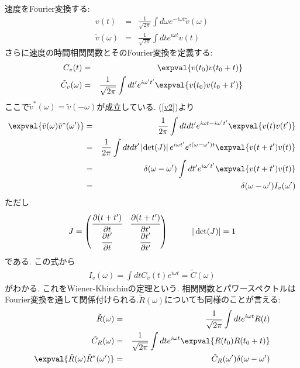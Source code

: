 \documentclass[10.5pt,a4paper]{jreport}
\begin{document}
速度をFourier変換する:
\begin{eqnarray}
  v(t) &=& \frac{1}{\sqrt{2\pi}}\int d\omega e^{-i\omega t}\tilde{v}(\omega)\label{v1}\\
  \tilde{v}(\omega) &=& \frac{1}{\sqrt{2\pi}}\int dt e^{i\omega t}v(t)\label{v2}
\end{eqnarray}
さらに速度の時間相関関数とそのFourier変換を定義する:
\begin{eqnarray}
  C_v(t) &=& \expval{v(t_0)v(t_0 + t)}\\
  \tilde{C}_v(\omega) &=& \frac{1}{\sqrt{2\pi}}\int dt'e^{i\omega't'}\expval{v(t_0)v(t_0+t')}
\end{eqnarray}
ここで$\tilde{v}^*(\omega) = \tilde{v}(-\omega)$が成立している. (\ref{v2})より
\begin{eqnarray}
  \expval{\tilde{v}(\omega)\tilde{v}^*(\omega')} &=& \frac{1}{2\pi}\int dtdt' e^{i\omega t-i\omega' t'}\expval{v(t)v(t')}\\
  &=&\frac{1}{2\pi}\int dtdt'\left|\det(J)\right| e^{i\omega t'}e^{i(\omega -\omega')t}\expval{v(t+t')v(t)}\\
  &=&\delta(\omega-\omega')\int dt'e^{i\omega' t'}\expval{v(t+t')v(t)}\\
  &=&\delta(\omega-\omega')I_v(\omega')
\end{eqnarray}
ただし
\begin{eqnarray}
  J =
  \begin{pmatrix}
    \cfrac{\partial(t+t')}{\partial t}&\cfrac{\partial(t+t')}{\partial t'}\\
    \cfrac{\partial t'}{\partial t}&\cfrac{\partial t'}{\partial t'}\\
  \end{pmatrix}\hspace{1cm} |\det(J)| = 1
\end{eqnarray}
である. この式から
\begin{eqnarray}
  I_v(\omega) = \int dtC_v(t)e^{i\omega t} = \tilde{C}(\omega)
\end{eqnarray}
がわかる. これをWiener-Khinchinの定理という. 相関関数とパワースペクトルはFourier変換を通して関係付けられる.$\tilde{R}(\omega)$についても同様のことが言える:
\begin{eqnarray}
  \tilde{R}(\omega) &=& \frac{1}{\sqrt{2\pi}}\int dt e^{i\omega t}R(t)\label{R2}\\
  \tilde{C}_R(\omega) &=& \frac{1}{\sqrt{2\pi}}\int dte^{i\omega t}\expval{R(t_0)R(t_0+t)}\\
  \expval{\tilde{R}(\omega)\tilde{R}^*(\omega')}&=& \tilde{C}_R(\omega')\delta(\omega-\omega') 
\end{eqnarray}
\end{document}
